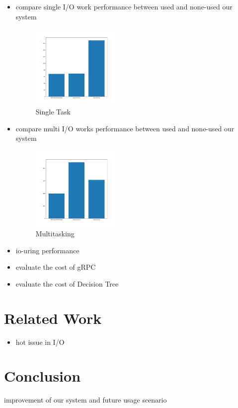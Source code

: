 \documentclass[conference]{IEEEtran}
\begin{document}
\begin{itemize}
	\item compare single I/O work performance between used and none-used our system
\begin{figure}[htbp]
	\centering
	\includegraphics[width=0.4\textwidth]{Figure_2.png}
	\caption{Single Task}
\end{figure}
	\item compare multi I/O works performance between used and none-used our system
\begin{figure}[htbp]
	\centering
	\includegraphics[width=0.4\textwidth]{Figure_1.png}
	\caption{Multitasking}
\end{figure}
	\item io-uring performance
	\item evaluate the cost of gRPC
	\item evaluate the cost of Decision Tree
\end{itemize}

\section{Related Work}
\begin{itemize}
	\item hot issue in I/O
\end{itemize}

\section{Conclusion}
improvement of our system and future usage scenario
\end{document}
